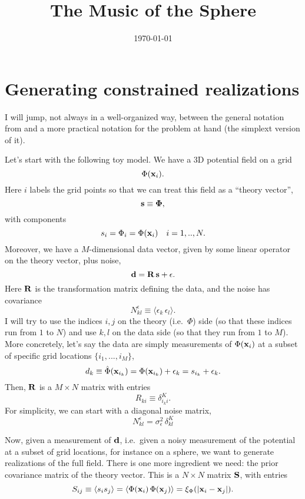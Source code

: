 \documentclass[prd, onecolumn, nofootinbib, floatfix]{revtex4-1}
\newcommand{\be}{\begin{equation}}
\newcommand{\ee}{\end{equation}}
\begin{document}
\title{The Music of the Sphere} 


\begin{abstract}


\end{abstract}

\date{\today} 

\maketitle

\section{Generating constrained realizations}


I will jump, not always in a well-organized way, between the general notation from \cite{zaroubietal95}
and a more practical notation for the problem at hand (the simplext version of it).


Let's start with the following toy model.
We have a 3D potential field on a grid
\be
\Phi({\bf x}_i).
\ee
Here $i$ labels the grid points so that we can treat this field as a ``theory vector'',
\be
{\bf s} \equiv {\bf \Phi},
\ee
with components
\be
s_i = \Phi_i = \Phi({\bf x}_i) \quad i = 1,..,N.
\ee
Moreover, we have a $M$-dimensional data vector, given by some linear operator on the theory vector, plus noise,
\be
{\bf d} = {\bf R} \, {\bf s} + {\bf \epsilon}.
\ee
Here ${\bf R}$ is the transformation matrix defining the data, and the noise
has covariance
\be
N^{\epsilon}_{kl} \equiv \langle \epsilon_k \, \epsilon_l \rangle.
\ee
I will try to use the indices $i,j$ on the theory (i.e.~$\Phi$) side (so that these indices run from $1$ to $N$)
and use $k,l$ on the data side (so that they run from $1$ to $M$).
More concretely, let's say the data are simply measurements of $\Phi({\bf x}_i)$ at
a subset of specific
grid locations $\{i_1,...,i_M \}$,
\be
d_k \equiv \hat{\Phi}({\bf x}_{i_k}) = \Phi({\bf x}_{i_k}) + \epsilon_k = s_{i_k} + \epsilon_k.
\ee
Then, ${\bf R}$ is a $M \times N$ matrix with entries
\be
R_{ki} \equiv \delta^{K}_{i_k i}.
\ee
For simplicity, we can start with a diagonal noise matrix,
\be
N^{\epsilon}_{kl} = \sigma^2_\epsilon \, \delta^{K}_{k l}
\ee


Now, given a measurement of ${\bf d}$, i.e.~given a noisy measurement
of the potential at a subset of grid locations, for instance on a sphere,
we want to generate realizations of the full field. There is one more ingredient we need:
the prior covariance matrix of the theory vector.
This is a $N \times N$ matrix ${\bf S}$, with entries
\be
S_{ij} \equiv \langle s_i s_j \rangle = \langle \Phi({\bf x}_i) \, \Phi({\bf x}_j) \rangle = \xi_\Phi(|{\bf x}_i - {\bf x}_j|).
\ee
\end{document}
